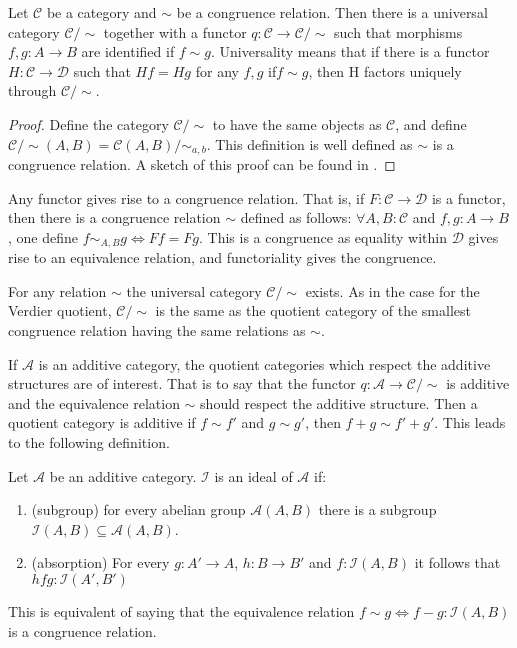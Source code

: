     \begin{prop}
        Let $\mathcal{C}$ be a category and $\sim$ be a congruence relation. Then there is a universal category $\mathcal{C}/\sim$ together with a functor $q:\mathcal{C}\rightarrow \mathcal{C}/\sim$ such that morphisms $f,g:A\rightarrow B$ are identified if $f\sim g$. Universality means that if there is a functor $H:\mathcal{C}\rightarrow \mathcal{D}$ such that $Hf=Hg$ for any $f,g$ if$f\sim g$, then H factors uniquely through $\mathcal{C}/\sim$.
    \end{prop}

    \begin{proof}
        Define the category $\mathcal{C}/\sim$ to have the same objects as $\mathcal{C}$, and define $\mathcal{C}/\sim (A,B)=\mathcal{C}(A,B)/\sim_{a,b}$. This definition is well defined as $\sim$ is a congruence relation. A sketch of this proof can be found in \cite{Mac71}.
    \end{proof}

    \begin{remark}
        Any functor gives rise to a congruence relation. That is, if $F:\mathcal{C}\rightarrow \mathcal{D}$ is a functor, then there is a congruence relation $\sim$ defined as follows: $\forall A,B:\mathcal{C}$ and $f,g:A\rightarrow B$, one define $f\sim_{A,B}g \iff Ff=Fg$. This is a congruence as equality within $\mathcal{D}$ gives rise to an equivalence relation, and functoriality gives the congruence.
    \end{remark}

    \begin{remark}
        For any relation $\sim$ the universal category $\mathcal{C}/\sim$ exists. As in the case for the Verdier quotient, $\mathcal{C}/\sim$ is the same as the quotient category of the smallest congruence relation having the same relations as $\sim$.
    \end{remark}

    If $\mathcal{A}$ is an additive category, the quotient categories which respect the additive structures are of interest. That is to say that the functor $q:\mathcal{A}\rightarrow \mathcal{C}/\sim$ is additive and the equivalence relation $\sim$ should respect the additive structure. Then a quotient category is additive if $f\sim f'$ and $g\sim g'$, then $f+g\sim f'+g'$. This leads to the following definition. 

    \begin{definition}
        Let $\mathcal{A}$ be an additive category. $\mathcal{I}$ is an ideal of $\mathcal{A}$ if:
        \begin{enumerate}
            \item (subgroup) for every abelian group $\mathcal{A}(A,B)$ there is a subgroup $\mathcal{I}(A,B)\subseteq\mathcal{A}(A,B)$.
            \item (absorption) For every $g:A'\rightarrow A$, $h:B\rightarrow B'$ and $f:\mathcal{I}(A,B)$ it follows that $hfg:\mathcal{I}(A',B')$
        \end{enumerate}
        This is equivalent of saying that the equivalence relation $f\sim g \iff f-g:\mathcal{I}(A,B)$ is a congruence relation.
    \end{definition}

